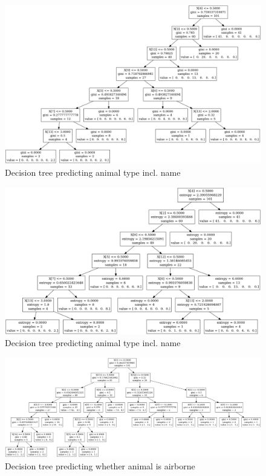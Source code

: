 \documentclass[	DIV=calc,%
				paper=a4,%
				fontsize=11pt,%
				twocolumn]{scrartcl}	 %
\begin{document}
\begin{figure}[h]
  \centering
  \caption{Decision tree predicting animal type incl. name}
  \label{7-2-gini}
  \includegraphics[width=1\textwidth]{./img/7-2-gini.jpg}
\end{figure}

\begin{figure}[h]
  \centering
  \caption{Decision tree predicting animal type incl. name}
  \label{7-2-entropy}
  \includegraphics[width=1\textwidth]{./img/7-2-entropy.jpg}
\end{figure}

\begin{figure}[h]
  \centering
  \caption{Decision tree predicting whether animal is airborne}
  \label{7-3-gini}
  \includegraphics[width=1\textwidth]{./img/7-3-gini.jpg}
\end{figure}
\end{document}
